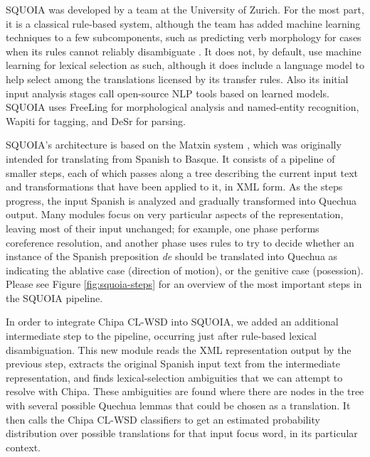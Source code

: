 SQUOIA was developed by a team at the University of Zurich. For the most part,
it is a classical rule-based system, although the team has added machine
learning techniques to a few subcomponents, such as predicting verb morphology
for cases when its rules cannot reliably disambiguate
\cite{riosgonzales-gohring:2013:HyTra}. It does not, by default, use machine
learning for lexical selection as such, although it does include a language
model to help select among the translations licensed by its transfer rules.
Also its initial input analysis stages call open-source NLP tools based on
learned models. SQUOIA uses FreeLing \cite{padro12} for morphological analysis
and named-entity recognition, Wapiti \cite{lavergne2010practical} for tagging,
and DeSr \cite{attardi-EtAl:2007:EMNLP-CoNLL2007} for parsing.

SQUOIA's architecture is based on the Matxin system \cite{matxin2005}, which
was originally intended for translating from Spanish to Basque. It consists of
a pipeline of smaller steps, each of which passes along a tree describing the
current input text and transformations that have been applied to it, in XML
form. As the steps progress, the input Spanish is analyzed and gradually
transformed into Quechua output. Many modules focus on very particular aspects
of the representation, leaving most of their input unchanged; for example, one
phase performs coreference resolution, and another phase uses rules to try to
decide whether an instance of the Spanish preposition \emph{de} should be
translated into Quechua as indicating the ablative case (direction of motion),
or the genitive case (posession). Please see Figure \ref{fig:squoia-steps} for
an overview of the most important steps in the SQUOIA pipeline.

In order to integrate Chipa CL-WSD into SQUOIA, we added an additional
intermediate step to the pipeline, occurring just after rule-based lexical
disambiguation. This new module reads the XML representation output by the
previous step, extracts the original Spanish input text from the intermediate
representation, and finds lexical-selection ambiguities that we can attempt to
resolve with Chipa. These ambiguities are found where there are nodes in the
tree with several possible Quechua lemmas that could be chosen as a
translation. It then calls the Chipa CL-WSD classifiers to get an estimated
probability distribution over possible translations for that input focus word,
in its particular context.

